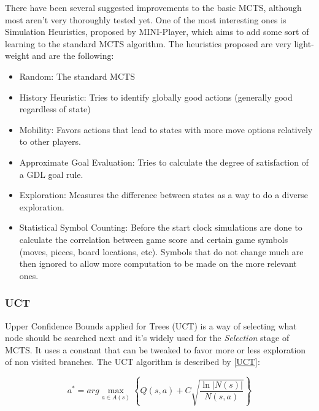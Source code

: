 There have been several suggested improvements to the basic MCTS, although most aren’t very thoroughly tested yet. One of the most interesting ones is Simulation Heuristics, proposed by MINI-Player, which aims to add some sort of learning to the standard MCTS algorithm. The heuristics proposed are very light-weight and are the following:

\begin{itemize}

\item Random: The standard MCTS

\item History Heuristic: Tries to identify globally good actions (generally good regardless of state)

\item Mobility: Favors actions that lead to states with more move options relatively to other players.

\item Approximate Goal Evaluation: Tries to calculate the degree of satisfaction of a GDL goal rule.

\item Exploration: Measures the difference between states as a way to do a diverse exploration.

\item Statistical Symbol Counting: Before the start clock simulations are done to calculate the correlation between game score and certain game symbols (moves, pieces, board locations, etc). Symbols that do not change much are then ignored to allow more computation to be made on the more relevant ones.

\end{itemize}

\subsubsection{UCT}
\label{sssec:UCT}

Upper Confidence Bounds applied for Trees (UCT) is a way of selecting what node should be searched next and it's widely used for the \textit{Selection} stage of \gls{MCTS}. It uses a constant that can be tweaked to favor more or less exploration of non visited branches. The UCT algorithm is described by \ref{UCT}:

\begin{center}
\begin{equation} \label{UCT}
a^{*} = arg \max_{a\in A(s)} \left \{ Q(s,a) + C \sqrt{\frac{\ln|N(s)|} {N(s,a)}} \right \}
\end{equation}
\end{center}

